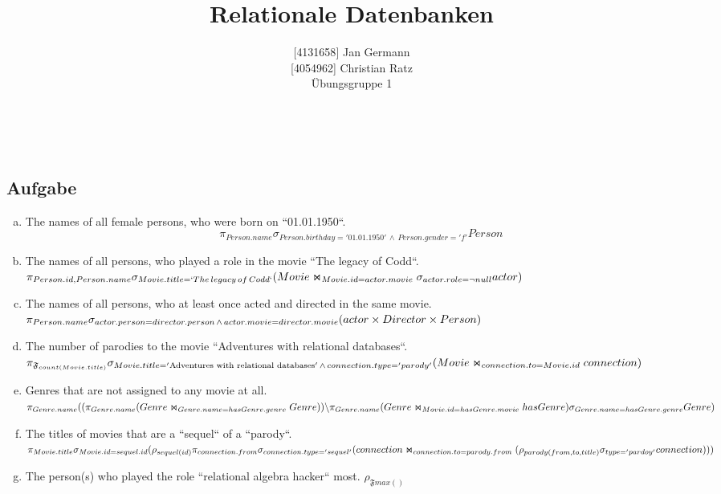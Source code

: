 \documentclass[11pt,a4paper,DIV=9]{scrartcl}
\author{{[}4131658{]} Jan Germann \\{[}4054962{]} Christian Ratz\\Übungsgruppe 1}
\title{Relationale Datenbanken}
\newcounter{temp}
\newcommand{\aufgabe}[1]{
  \setcounter{temp}{\value{subsection}}
  \setcounter{subsection}{#1}
  \addtocounter{subsection}{-1}
  \subsection{Aufgabe}
  \setcounter{subsection}{\value{temp}}
}
\renewcommand{\author}[1]{\renewcommand{\author}{#1}}
\renewcommand{\title}[1]{\renewcommand{\title}{#1}}
\newcommand{\makehomeworktitle}{
  \begin{minipage}[t]{6.5cm}
    \sf{\author}
  \end{minipage}
  \begin{minipage}[t]{6.5cm}
    \begin{flushright}
      \sf{\title\\\today}
    \end{flushright}
  \end{minipage}
  \\[0.2cm]
  \begin{center}
    \sf{
      \color{blue}{
        \LARGE{Aufgabenblatt \blattnr}
      }
    }
  \end{center}
  \vspace{0.1cm}
}
\begin{document}
\makehomeworktitle
\aufgabe{1}
  \begin{enumerate}[a)]
    \item The names of all female persons, who were born on ``01.01.1950``.
      \[ \pi_{Person.name} \sigma_{Person.birthday = '01.01.1950'\,\wedge\,Person.gender = 'f'}Person \]
    \item The names of all persons, who played a role in the movie ``The legacy of Codd``. \hfill\\
      $ \pi _{Person.id, Person.name}\\
        \sigma _{Movie.title=`{The\, legacy\, of\, Codd`}}\\
        (Movie\Join_{Movie.id = actor.movie} \sigma _{actor.role = \neg null} actor)
      $
    \item The names of all persons, who at least once acted and directed in the same movie.\hfill\\
      $
      \pi _{Person.name}\\
      \sigma _{actor.person = director.person \,\wedge\, actor.movie = director.movie}\\
      (actor \times Director \times Person)
      $
    \item The number of parodies to the movie ``Adventures with relational databases``.
      $
      \pi_{\mathfrak{F}_{count(Movie.title)}} \\
      \sigma_{Movie.title = '\textrm{Adventures with relational databases}' \,\wedge\, connection.type = 'parody'}\\
      (Movie\Join_{connection.to = Movie.id}connection)
      $

    \item Genres that are not assigned to any movie at all. \hfill \\
      $
        \pi _{Genre.name} \\
          ((\pi _{Genre.name}\\
          (Genre \Join _{Genre.name = hasGenre.genre} Genre ))\\
          \backslash \pi _{Genre.name} (Genre \Join _{Movie.id = hasGenre.movie} hasGenre)\\
          \sigma _{Genre.name = hasGenre.genre} Genre)
      $
    \item The titles of movies that are a ``sequel`` of a ``parody``. \\
      $\pi_{Movie.title} \\
      \sigma_{Movie.id = sequel.id} \\
      (\rho_{sequel(id)}\\
      \pi_{connection.from}\sigma_{connection.type='sequel'}\\
      (connection \Join_{connection.to = parody.from} \\ 
        (\rho_{parody(from,to,title)}\sigma_{type='pardoy'}connection)\\
      )\\
      )$
    \item The person(s) who played the role ``relational algebra hacker`` most.
      $
      \rho_{\mathfrak{F}max()}
      $
  \end{enumerate}
\end{document}
